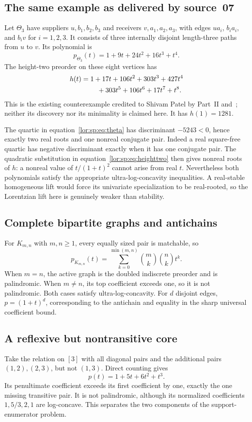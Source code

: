 \documentclass[11pt]{article}
\numberwithin{equation}{section}
\theoremstyle{definition}
\begin{document}
\subsection{The same example as delivered by source~07}
\label{lor:sp:ex:theta}
Let $\Theta_3$ have suppliers $u,b_1,b_2,b_3$ and receivers $v,a_1,a_2,a_3$,
with edges $u a_i$, $b_i a_i$, and $b_i v$ for $i=1,2,3$. It consists of
three internally disjoint length-three paths from $u$ to $v$. Its polynomial is
\begin{equation}
 p_{\Theta_3}(t)=1+9t+24t^2+16t^3+t^4.
 \label{lor:sp:eq:theta}
\end{equation}
The height-two preorder on these eight vertices has
\begin{align}
 h(t)={}&1+17t+106t^2+303t^3+427t^4\notag\\
       &\quad+303t^5+106t^6+17t^7+t^8.
 \label{lor:sp:eq:theta-h}
\end{align}
This is the existing counterexample credited to Shivam Patel by
Part~II and~\cite{Patel}; neither its discovery nor its minimality is claimed here.
It has $h(1)=1281$.

The quartic in equation~\eqref{lor:sp:eq:theta} has discriminant $-5243<0$, hence exactly
two real roots and one nonreal conjugate pair. Indeed a real square-free
quartic has negative discriminant exactly when it has one conjugate pair.
The quadratic substitution in equation~\eqref{lor:sp:eq:heighttwo} then gives nonreal roots of
$h$: a nonreal value of $t/(1+t)^2$ cannot arise from real $t$.
Nevertheless both polynomials satisfy the appropriate ultra-log-concavity
inequalities. A real-stable homogeneous lift would force its univariate
specialization to be real-rooted, so the Lorentzian lift here is genuinely
weaker than stability.
\subsection{Complete bipartite graphs and antichains}
For $K_{m,n}$ with $m,n\ge1$, every equally sized pair is matchable, so
\[
 p_{K_{m,n}}(t)=\sum_{k=0}^{\min(m,n)}\binom m k\binom n k t^k.
\]
When $m=n$, the active graph is the doubled indiscrete preorder and is
palindromic. When $m\ne n$, its top coefficient exceeds one, so it is not
palindromic. Both cases satisfy ultra-log-concavity. For $d$ disjoint edges,
$p=(1+t)^d$, corresponding to the antichain and equality in the sharp universal
coefficient bound.

\subsection{A reflexive but nontransitive core}
Take the relation on $[3]$ with all diagonal pairs and the additional pairs
$(1,2),(2,3)$, but not $(1,3)$. Direct counting gives
\[
 p(t)=1+5t+6t^2+t^3.
\]
Its penultimate coefficient exceeds its first coefficient by one, exactly the
one missing transitive pair. It is not palindromic, although its normalized
coefficients $1,5/3,2,1$ are log-concave. This separates the two components
of the support-enumerator problem.
\end{document}
